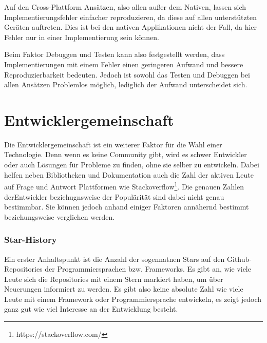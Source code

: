 Auf den Cross-Plattform Ansätzen, also allen außer dem Nativen, lassen sich Implementierungsfehler einfacher reproduzieren, da diese auf allen unterstützten Geräten auftreten. Dies ist bei den nativen Applikationen nicht der Fall, da hier Fehler nur in einer Implementierung sein können.

Beim Faktor Debuggen und Testen kann also festgestellt werden, dass Implementierungen mit einem Fehler einen geringeren Aufwand und bessere Reproduzierbarkeit bedeuten. Jedoch ist sowohl das Testen und Debuggen bei allen Ansätzen Problemlos möglich, lediglich der Aufwand unterscheidet sich.

\section{Entwicklergemeinschaft}
Die Entwicklergemeinschaft ist ein weiterer Faktor für die Wahl einer Technologie. Denn wenn es keine Community gibt, wird es schwer Entwickler oder auch Lösungen für Probleme zu finden, ohne sie selber zu entwickeln. Dabei helfen neben Bibliotheken und Dokumentation auch die Zahl der aktiven Leute auf Frage und Antwort Plattformen wie Stackoverflow\footnote{https://stackoverflow.com/}.  Die genauen Zahlen derEntwickler beziehugnsweise der Populärität sind dabei nicht genau bestimmbar. Sie können jedoch anhand einiger Faktoren annähernd bestimmt beziehungsweise verglichen werden.

\subsubsection{Star-History}
Ein erster Anhaltspunkt ist die Anzahl der sogennatnen Stars auf den Github-Repositories der Programmiersprachen bzw. Frameworks. Es gibt an, wie viele Leute sich die Repositories mit einem Stern markiert haben, um über Neuerungen informiert zu werden. Es gibt also keine absolute Zahl wie viele Leute mit einem Framework oder Programmiersprache entwickeln, es zeigt jedoch ganz gut wie viel Interesse an der Entwicklung besteht.

